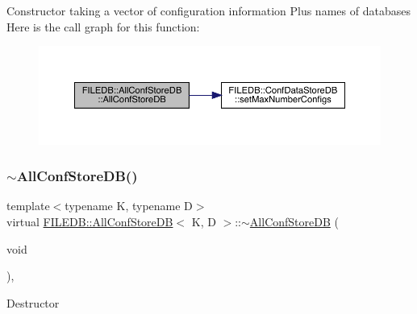Constructor taking a vector of configuration information Plus names of databases Here is the call graph for this function\+:
\nopagebreak
\begin{figure}[H]
\begin{center}
\leavevmode
\includegraphics[width=350pt]{df/db6/classFILEDB_1_1AllConfStoreDB_ab8b213578395f0ac7d436a82f4a26fe1_cgraph}
\end{center}
\end{figure}
\mbox{\label{classFILEDB_1_1AllConfStoreDB_ac5fe65eab60f20d7b8124c69c0bd5923}} 
\subsubsection{\texorpdfstring{$\sim$AllConfStoreDB()}{~AllConfStoreDB()}\hspace{0.1cm}{\footnotesize\ttfamily [1/3]}}
{\footnotesize\ttfamily template$<$typename K, typename D$>$ \\
virtual \mbox{\hyperlink{classFILEDB_1_1AllConfStoreDB}{F\+I\+L\+E\+D\+B\+::\+All\+Conf\+Store\+DB}}$<$ K, D $>$\+::$\sim$\mbox{\hyperlink{classFILEDB_1_1AllConfStoreDB}{All\+Conf\+Store\+DB}} (\begin{DoxyParamCaption}\item[{void}]{ }\end{DoxyParamCaption})\hspace{0.3cm}{\ttfamily [inline]}, {\ttfamily [virtual]}}

Destructor \mbox{\label{classFILEDB_1_1AllConfStoreDB_a72b72501b29029e2bfb682565f96eac0}} 
